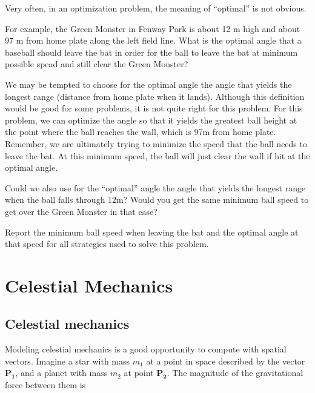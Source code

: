 \documentclass[
]{book}
\numberwithin{Answer}{chapter}
\numberwithin{Exercise}{chapter}
\renewcommand{\vec}[1]{\bm{\mathbf{#1}}}
\begin{document}
\begin{ex}
Very often, in an optimization problem, the meaning of ``optimal'' is not obvious.

For example, the Green Monster in Fenway Park is about 12 m high and about 97
m from home plate along the left field line.
What is the optimal angle that a baseball should leave the bat in order
for the ball 
to leave the bat at minimum possible spead and still clear the Green Monster?

We may be tempted
to choose for the optimal angle the angle that yields the longest
range (distance from home plate when it lands).  
Although this definition would be good for some problems,
it is not quite right for this problem.  
For this problem, we can optimize the angle so that it
yields the greatest ball height at the point where
the ball reaches the wall, which is 97m from home plate.
Remember, we are ultimately trying to minimize
the speed that the ball needs to leave the bat.  At this minimum speed,
the ball will just clear the wall if hit at the optimal angle.

Could we also use for the ``optimal'' angle the 
angle that yields the longest range when the ball falls
through 12m?  Would you get the same minimum ball speed
to get over the Green Monster in that case?

Report the minimum ball speed when leaving the bat and the optimal angle
at that speed for all strategies used to solve this problem.
\end{ex}





\chapter{Celestial Mechanics}

\section{Celestial mechanics}

Modeling celestial mechanics is a good opportunity
to compute with spatial vectors.
Imagine a star with mass $m_1$ at a point in space described by the
vector $\vec{P_1}$, and a planet with mass $m_2$ at point $\vec{P_2}$.
The magnitude of the gravitational force between them is
\end{document}
